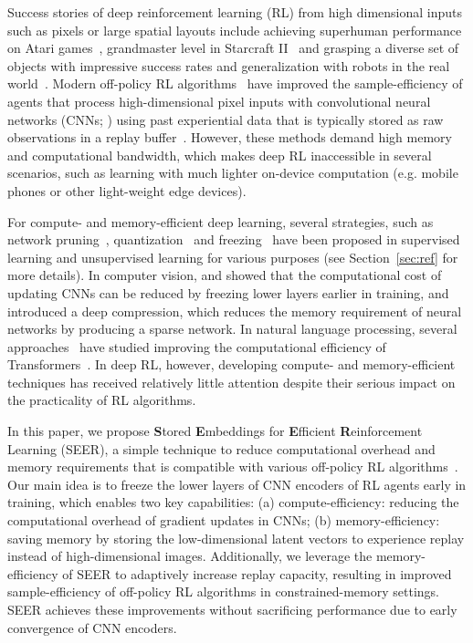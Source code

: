 \documentclass{article}
\begin{document}
Success stories of deep reinforcement learning (RL) from high dimensional inputs such as pixels or large spatial layouts include achieving superhuman performance on Atari games~\citep{mnih2015human, schrittwieser2019mastering,  badia2020agent57}, grandmaster level in Starcraft II~\citep{vinyals2019grandmaster} and grasping a diverse set of objects with impressive success rates and generalization with robots in the real world~\citep{kalashnikov2018qt}.
Modern off-policy RL algorithms~\citep{mnih2015human, hessel2018rainbow, hafner2018learning, hafner2019dream, srinivas2020curl, kostrikov2020image, laskin2020reinforcement} have improved the sample-efficiency of agents that process high-dimensional pixel inputs with convolutional neural networks (CNNs; \citealt{lecun1998gradient}) using past experiential data that is typically stored as raw observations in a replay buffer~\citep{lin1992self}.
However, these methods demand high memory and computational bandwidth, which makes deep RL inaccessible in several scenarios, such as learning with much lighter on-device computation (e.g. mobile phones or other light-weight edge devices).


For compute- and memory-efficient deep learning, 
several strategies, such as network pruning~\citep{han2015deep, frankle2018lottery}, quantization~\citep{han2015deep,iandola2016squeezenet} and freezing~\citep{yosinski2014transferable,46337} 
have been proposed in supervised learning and unsupervised learning for various purposes (see Section~\ref{sec:ref} for more details).
In computer vision, 
\citet{46337} and \citet{brock2017freezeout} showed that the computational cost of updating CNNs can be reduced by freezing lower layers earlier in training, and \citet{han2015deep} introduced a deep compression, which reduces the memory requirement of neural networks by producing a sparse network.
In natural language processing,
several approaches~\citep{tay2019lightweight,sun2020mobilebert} have studied improving the computational efficiency of Transformers~\citep{vaswani2017attention}.
In deep RL, however, developing compute- and memory-efficient techniques has received relatively little attention despite their serious impact on the practicality of RL algorithms.



In this paper, we propose {\bf S}tored {\bf E}mbeddings for {\bf E}fficient {\bf R}einforcement Learning (SEER),
a simple technique to reduce computational overhead and memory requirements that is compatible with various off-policy RL algorithms~\citep{haarnoja2018soft,hessel2018rainbow,srinivas2020curl}.
Our main idea is to freeze the lower layers of CNN encoders of RL agents early in training, which enables two key capabilities: 
(a) compute-efficiency: reducing the computational overhead of gradient updates in CNNs; 
(b) memory-efficiency: saving memory by storing the low-dimensional latent vectors to experience replay instead of high-dimensional images. Additionally, we leverage the memory-efficiency of SEER to adaptively increase replay capacity, resulting in improved sample-efficiency of off-policy RL algorithms in constrained-memory settings. SEER achieves these improvements without sacrificing performance due to early convergence of CNN encoders. 
\end{document}
